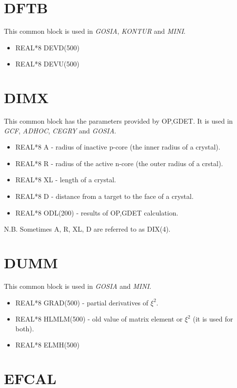 \section{DFTB}

This common block is used in {\em GOSIA}, {\em KONTUR} and {\em MINI}.

\begin{itemize}
\item REAL*8 DEVD(500)
\item REAL*8 DEVU(500)
\end{itemize}

\section{DIMX}

This common block has the parameters provided by OP,GDET. It is used in {\em
GCF}, {\em ADHOC}, {\em CEGRY} and {\em GOSIA}.

\begin{itemize}
\item REAL*8 A - radius of inactive p-core (the inner radius of a crystal).
\item REAL*8 R - radius of the active n-core (the outer radius of a crstal).
\item REAL*8 XL - length of a crystal.
\item REAL*8 D - distance from a target to the face of a crystal.
\item REAL*8 ODL(200) - results of OP,GDET calculation.
\end{itemize}

N.B. Sometimes A, R, XL, D are referred to as DIX(4).

\section{DUMM}

This common block is used in {\em GOSIA} and {\em MINI}.

\begin{itemize}
\item REAL*8 GRAD(500) - partial derivatives of $\xi^2$.
\item REAL*8 HLMLM(500) - old value of matrix element or $\xi^2$ (it is used
for both).
\item REAL*8 ELMH(500)
\end{itemize}

\section{EFCAL}

